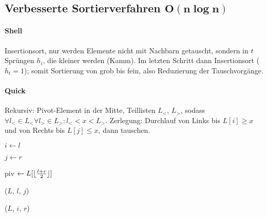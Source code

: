 \subsection{Verbesserte Sortierverfahren $\mathbf{O(n \log n)}$}

\paragraph{Shell}
Insertionsort, nur werden Elemente nicht mit Nachbarn getauscht, sondern in $t$ Sprüngen $h_i$, die kleiner werden (Kamm). Im letzten Schritt dann Insertionsort ($h_t = 1$); somit Sortierung von grob bis fein, also Reduzierung der Tauschvorgänge.

\begin{algorithm}[H]


\end{algorithm}

\paragraph{Quick}
Rekursiv: Pivot-Element in der Mitte, Teillisten $L_<$, $L_>$, sodass $\forall l_< \in L_< \forall l_> \in L_>: l_< < x < L_>$. Zerlegung: Durchlauf von Links bis $L[i] \geq x$ und von Rechts bis $L[j] \leq x$, dann tauschen.


\begin{algorithm}[H]



  $i \leftarrow l$

  $j \leftarrow r$

  piv $\leftarrow L[\lfloor \frac{l + r}{2} \rfloor]$


  \Quicksort($L$, $l$, $j$)

  \Quicksort($L$, $i$, $r$)
\end{algorithm}

